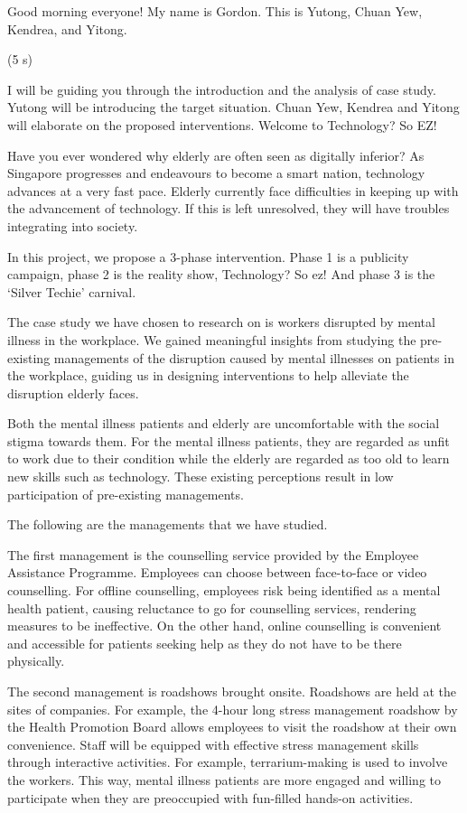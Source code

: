 \documentclass{article}
\begin{document}
Good morning everyone! My name is Gordon. This is Yutong, Chuan Yew, Kendrea, and Yitong.\par
 (5 s)\par
 I will be guiding you through the introduction and the analysis of case study. Yutong will be introducing the target situation. Chuan Yew, Kendrea and Yitong will elaborate on the proposed interventions. Welcome to Technology? So EZ!\par
 Have you ever wondered why elderly are often seen as digitally inferior? As Singapore progresses and endeavours to become a smart nation, technology advances at a very fast pace. Elderly currently face difficulties in keeping up with the advancement of technology. If this is left unresolved, they will have troubles integrating into society. \par
 In this project, we propose a 3-phase intervention. Phase 1 is a publicity campaign, phase 2 is the reality show, Technology? So ez! And phase 3 is the ‘Silver Techie’ carnival.\par
 The case study we have chosen to research on is workers disrupted by mental illness in the workplace. We gained meaningful insights from studying the pre-existing managements of the disruption caused by mental illnesses on patients in the workplace, guiding us in designing interventions to help alleviate the disruption elderly faces.\par
 Both the mental illness patients and elderly are uncomfortable with the social stigma towards them. For the mental illness patients, they are regarded as unfit to work due to their condition while the elderly are regarded as too old to learn new skills such as technology. These existing perceptions result in low participation of pre-existing managements.\par
 The following are the managements that we have studied.\par
 The first management is the counselling service provided by the Employee Assistance Programme. Employees can choose between face-to-face  or video counselling. For offline counselling, employees risk being identified as a mental health patient, causing reluctance to go for counselling services, rendering measures to be ineffective. On the other hand, online counselling is convenient and accessible  for patients seeking help  as they do not have to be there physically. \par
 The second management is roadshows brought onsite. Roadshows are held at the sites of companies. For example, the 4-hour long stress management roadshow by the Health Promotion Board allows employees to visit the roadshow at their own convenience. Staff will be equipped with effective stress management skills through interactive activities. For example, terrarium-making is used to involve the workers. This way, mental illness patients are more engaged and willing to participate when they are preoccupied with fun-filled hands-on activities.\par 
\end{document}

